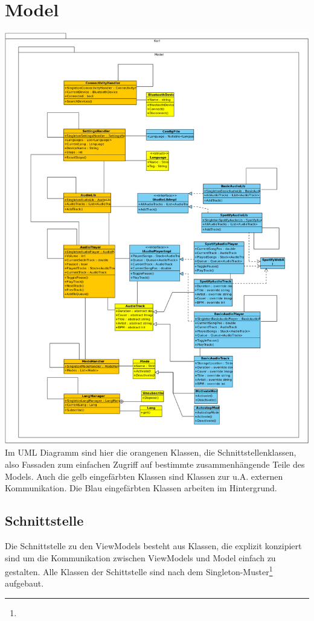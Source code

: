 \documentclass[../entwurf.tex]{subfiles}
\begin{document}
	\section{Model}
		\includegraphics[width=\textwidth,height=\textheight,keepaspectratio]{../graphics/uml_diagramme/Model.png}
		\newpage
		Im UML Diagramm sind hier die orangenen Klassen, die Schnittstellenklassen, also Fassaden zum einfachen 
		Zugriff auf bestimmte zusammenhängende Teile des Models. Auch die gelb eingefärbten Klassen sind Klassen zur 
		u.A. externen Kommunikation. Die Blau eingefärbten Klassen arbeiten im Hintergrund.
		\subsection{Schnittstelle}
			Die Schnittstelle zu den ViewModels besteht aus Klassen, die explizit konzipiert sind um die Kommunikation zwischen ViewModels und Model
			einfach zu gestalten. Alle Klassen der Schittstelle sind nach dem 
			Singleton-Muster\footnote{} aufgebaut.
\end{document}
